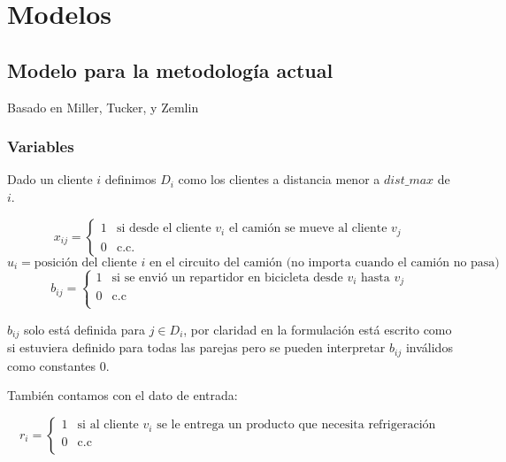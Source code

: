 \documentclass[10pt,a4paper]{article}
\begin{document}

	\fecha{\today}



	\maketitle

\section{Modelos}
\subsection{Modelo para la metodología actual}

	Basado en Miller, Tucker, y Zemlin

\subsubsection{Variables}

	Dado un cliente $i$ definimos $D_i$ como los clientes a distancia menor a $dist\_max$ de $i$.

	\[
		x_{ij} = \begin{cases}
			1 & \text{si desde el cliente $v_i$ el camión se mueve al cliente $v_j$}\\
			0 & \text{c.c.}
		\end{cases}
	\]
	\[
		u_{i} = \text{posición del cliente $i$ en el circuito del camión (no importa cuando el camión no pasa)}
	\]
	\[
		b_{ij} = \begin{cases}
			1 & \text{si se envió un repartidor en bicicleta desde $v_i$ hasta $v_j$}\\
			0 & \text{c.c}\\
		\end{cases}
	\]

	$b_{ij}$ solo está definida para $j \in D_i$, por claridad en la formulación está escrito como si estuviera definido para todas las parejas pero se pueden interpretar $b_{ij}$ inválidos como constantes 0.

	También contamos con el dato de entrada:

	\[
		r_{i} = \begin{cases}
			1 & \text{si al cliente $v_i$ se le entrega un producto que necesita refrigeración}\\
			0 & \text{c.c}\\
		\end{cases}
	\]
\end{document}
